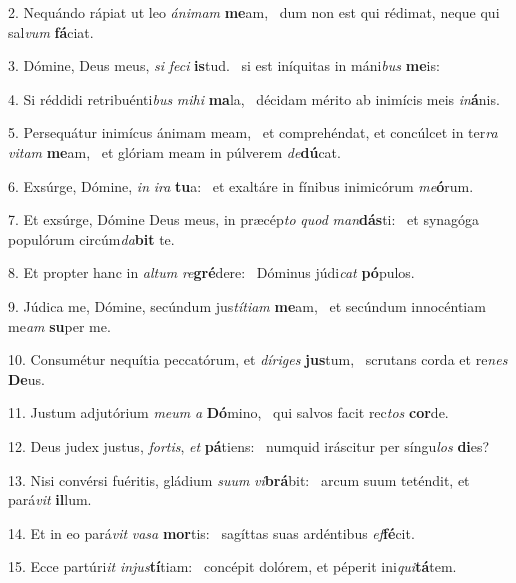 2. Nequándo rápiat ut leo \textit{á}\textit{ni}\textit{mam} \textbf{me}am, \ast\  dum non est qui rédimat, neque qui sal\textit{vum} \textbf{fá}ciat.\

3. Dómine, Deus meus, \textit{si} \textit{fe}\textit{ci} \textbf{is}tud. \ast\  si est iníquitas in máni\textit{bus} \textbf{me}is:\

4. Si réddidi retribuénti\textit{bus} \textit{mi}\textit{hi} \textbf{ma}la, \ast\  décidam mérito ab inimícis meis \textit{in}\textbf{á}nis.\

5. Persequátur inimícus ánimam meam, \dag\  et comprehéndat, et concúlcet in ter\textit{ra} \textit{vi}\textit{tam} \textbf{me}am, \ast\  et glóriam meam in púlverem \textit{de}\textbf{dú}cat.\

6. Exsúrge, Dómine, \textit{in} \textit{i}\textit{ra} \textbf{tu}a: \ast\  et exaltáre in fínibus inimicórum \textit{me}\textbf{ó}rum.\

7. Et exsúrge, Dómine Deus meus, in præcép\textit{to} \textit{quod} \textit{man}\textbf{dás}ti: \ast\  et synagóga populórum circúm\textit{da}\textbf{bit} te.\

8. Et propter hanc in \textit{al}\textit{tum} \textit{re}\textbf{gré}dere: \ast\  Dóminus júdi\textit{cat} \textbf{pó}pulos.\

9. Júdica me, Dómine, secúndum jus\textit{tí}\textit{ti}\textit{am} \textbf{me}am, \ast\  et secúndum innocéntiam me\textit{am} \textbf{su}per me.\

10. Consumétur nequítia peccatórum, et \textit{dí}\textit{ri}\textit{ges} \textbf{jus}tum, \ast\  scrutans corda et re\textit{nes} \textbf{De}us.\

11. Justum adjutórium \textit{me}\textit{um} \textit{a} \textbf{Dó}mino, \ast\  qui salvos facit rec\textit{tos} \textbf{cor}de.\

12. Deus judex justus, \textit{for}\textit{tis}, \textit{et} \textbf{pá}tiens: \ast\  numquid iráscitur per síngu\textit{los} \textbf{di}es?\

13. Nisi convérsi fuéritis, gládium \textit{su}\textit{um} \textit{vi}\textbf{brá}bit: \ast\  arcum suum teténdit, et pará\textit{vit} \textbf{il}lum.\

14. Et in eo pará\textit{vit} \textit{va}\textit{sa} \textbf{mor}tis: \ast\  sagíttas suas ardéntibus \textit{ef}\textbf{fé}cit.\

15. Ecce partúri\textit{it} \textit{in}\textit{jus}\textbf{tí}tiam: \ast\  concépit dolórem, et péperit ini\textit{qui}\textbf{tá}tem.\

